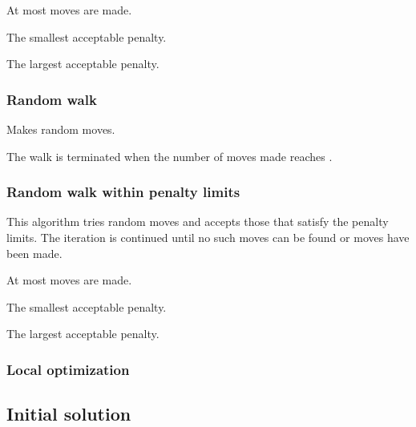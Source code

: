 \documentclass[12pt,a4paper]{article}
\begin{document}
\begin{owndescription}
\item[\Var{maxiter}] At most  moves are made.
\item[\Var{minpen}] The smallest acceptable penalty.
\item[\Var{maxpen}] The largest acceptable penalty.
\end{owndescription}

\subsubsection{Random walk}
\label{sec:rwalk}

Makes random moves.

\begin{owndescription}
\item[\Var{maxiter}] The walk is terminated when the number of moves
  made reaches .
\end{owndescription}

\subsubsection{Random walk within penalty limits}
\label{sec:rwalkpen}

This algorithm tries random moves and accepts those that satisfy the
penalty limits. The iteration is continued until no such moves can be
found or  moves have been made.

\begin{owndescription}
\item[\Var{maxiter}] At most  moves are made.
\item[\Var{minpen}] The smallest acceptable penalty.
\item[\Var{maxpen}] The largest acceptable penalty.
\end{owndescription}

\subsubsection{Local optimization}
\label{sec:local}

\subsection{Initial solution}
\end{document}

